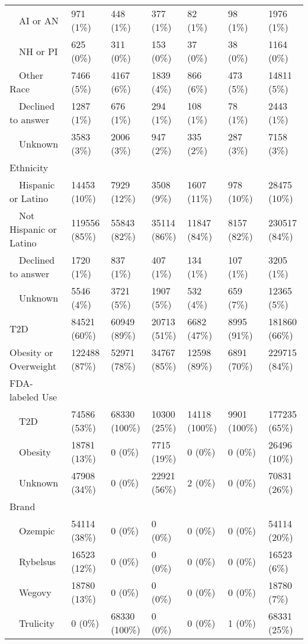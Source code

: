 \begin{longtable}{p{}p{}p{}p{}p{}p{}p{}}
    AI or AN & 971 (1\%) & 448 (1\%) & 377 (1\%) & 82 (1\%) & 98 (1\%) & 1976 (1\%) \\ 
    NH or PI & 625 (0\%) & 311 (0\%) & 153 (0\%) & 37 (0\%) & 38 (0\%) & 1164 (0\%) \\ 
    Other Race & 7466 (5\%) & 4167 (6\%) & 1839 (4\%) & 866 (6\%) & 473 (5\%) & 14811 (5\%) \\ 
    Declined to answer & 1287 (1\%) & 676 (1\%) & 294 (1\%) & 108 (1\%) & 78 (1\%) & 2443 (1\%) \\ 
    Unknown & 3583 (3\%) & 2006 (3\%) & 947 (2\%) & 335 (2\%) & 287 (3\%) & 7158 (3\%) \\ 
  Ethnicity &  &  &  &  &  &  \\ 
    Hispanic or Latino & 14453 (10\%) & 7929 (12\%) & 3508 (9\%) & 1607 (11\%) & 978 (10\%) & 28475 (10\%) \\ 
    Not Hispanic or Latino & 119556 (85\%) & 55843 (82\%) & 35114 (86\%) & 11847 (84\%) & 8157 (82\%) & 230517 (84\%) \\ 
    Declined to answer & 1720 (1\%) & 837 (1\%) & 407 (1\%) & 134 (1\%) & 107 (1\%) & 3205 (1\%) \\ 
    Unknown & 5546 (4\%) & 3721 (5\%) & 1907 (5\%) & 532 (4\%) & 659 (7\%) & 12365 (5\%) \\ 
  T2D & 84521 (60\%) & 60949 (89\%) & 20713 (51\%) & 6682 (47\%) & 8995 (91\%) & 181860 (66\%) \\ 
  Obesity or Overweight & 122488 (87\%) & 52971 (78\%) & 34767 (85\%) & 12598 (89\%) & 6891 (70\%) & 229715 (84\%) \\ 
  FDA-labeled Use &  &  &  &  &  &  \\ 
    T2D & 74586 (53\%) & 68330 (100\%) & 10300 (25\%) & 14118 (100\%) & 9901 (100\%) & 177235 (65\%) \\ 
    Obesity & 18781 (13\%) & 0 (0\%) & 7715 (19\%) & 0 (0\%) & 0 (0\%) & 26496 (10\%) \\ 
    Unknown & 47908 (34\%) & 0 (0\%) & 22921 (56\%) & 2 (0\%) & 0 (0\%) & 70831 (26\%) \\ 
  Brand &  &  &  &  &  &  \\ 
    Ozempic & 54114 (38\%) & 0 (0\%) & 0 (0\%) & 0 (0\%) & 0 (0\%) & 54114 (20\%) \\ 
    Rybelsus & 16523 (12\%) & 0 (0\%) & 0 (0\%) & 0 (0\%) & 0 (0\%) & 16523 (6\%) \\ 
    Wegovy & 18780 (13\%) & 0 (0\%) & 0 (0\%) & 0 (0\%) & 0 (0\%) & 18780 (7\%) \\ 
    Trulicity & 0 (0\%) & 68330 (100\%) & 0 (0\%) & 0 (0\%) & 1 (0\%) & 68331 (25\%) \\ 

\end{longtable}
